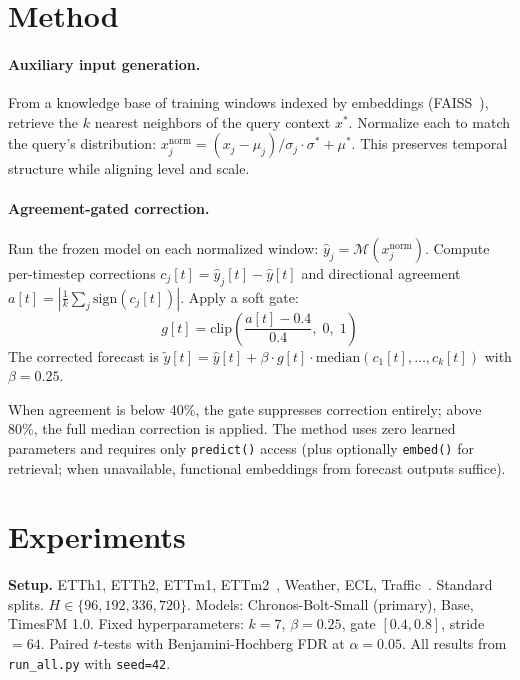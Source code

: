 \documentclass{article}
\begin{document}
\section{Method}
\label{sec:method}

\paragraph{Auxiliary input generation.}
From a knowledge base of training windows indexed by embeddings (FAISS~\cite{johnson2019faiss}), retrieve the $k$ nearest neighbors of the query context $x^*$. Normalize each to match the query's distribution: $x_j^{\text{norm}} = (x_j - \mu_j)/\sigma_j \cdot \sigma^* + \mu^*$. This preserves temporal structure while aligning level and scale.

\paragraph{Agreement-gated correction.}
Run the frozen model on each normalized window: $\hat{y}_j = \mathcal{M}(x_j^{\text{norm}})$. Compute per-timestep corrections $c_j[t] = \hat{y}_j[t] - \hat{y}[t]$ and directional agreement $a[t] = |\frac{1}{k}\sum_j \text{sign}(c_j[t])|$. Apply a soft gate:
\begin{equation}
g[t] = \text{clip}\!\left(\frac{a[t] - 0.4}{0.4},\; 0,\; 1\right)
\end{equation}
The corrected forecast is $\tilde{y}[t] = \hat{y}[t] + \beta \cdot g[t] \cdot \text{median}(c_1[t], \ldots, c_k[t])$ with $\beta = 0.25$.

When agreement is below 40\%, the gate suppresses correction entirely; above 80\%, the full median correction is applied. The method uses zero learned parameters and requires only \texttt{predict()} access (plus optionally \texttt{embed()} for retrieval; when unavailable, functional embeddings from forecast outputs suffice).

\section{Experiments}
\label{sec:experiments}

\textbf{Setup.} ETTh1, ETTh2, ETTm1, ETTm2~\cite{zhou2021informer}, Weather, ECL, Traffic~\cite{wu2021autoformer}. Standard splits. $H \in \{96, 192, 336, 720\}$. Models: Chronos-Bolt-Small (primary), Base, TimesFM 1.0. Fixed hyperparameters: $k{=}7$, $\beta{=}0.25$, gate $[0.4, 0.8]$, stride${=}64$. Paired $t$-tests with Benjamini-Hochberg FDR at $\alpha{=}0.05$. All results from \texttt{run\_all.py} with \texttt{seed=42}.
\end{document}
